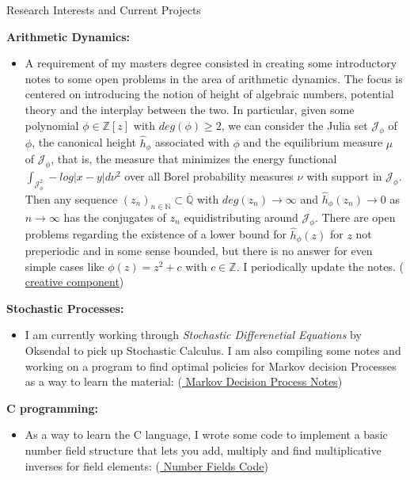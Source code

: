 \documentclass{resume} %
\newcommand{\N}{\mathbb{N}}
\newcommand{\Z}{\mathbb{Z}}
\newcommand{\Q}{\mathbb{Q}}
\newcommand{\MJ}{\mathcal{J}}
\begin{document}
\begin{rSection}{Research Interests and Current Projects}

{\bf Arithmetic Dynamics:}  
\begin{itemize}
\item A requirement of my masters degree consisted in creating some introductory notes to some open problems in the area of arithmetic dynamics. The focus is centered on introducing the notion of height of algebraic numbers,  potential theory and the interplay between the two. In particular, given some polynomial $\phi \in \Z[z]$ with $deg(\phi) \geq 2$, we can consider the Julia set $\MJ_{\phi}$ of $\phi$, the canonical height $\hat{h}_\phi$ associated with $\phi$ and the equilibrium measure $\mu$ of $\MJ_{\phi}$, that is, the measure that minimizes the energy functional $\int_{\MJ_{\phi}^2}-log|x-y|d\nu^2$ over all Borel probability measures $\nu$ with support in $\MJ_{\phi}$. Then any sequence $(z_n)_{n \in \N} \subset \overline{\Q}$ with $deg(z_n) \rightarrow \infty$ and $\hat{h}_{\phi}(z_n) \rightarrow 0$ as $n \rightarrow \infty$ has the conjugates of $z_n$ equidistributing around $\MJ_\phi$. There are open problems regarding the existence of a lower bound for $\hat{h}_{\phi}(z)$ for $z$ not preperiodic and in some sense bounded, but there is no answer for even simple cases like $\phi(z) = z^2+c$ with $c \in \Z$. I periodically update the notes. (\href{https://github.com/carsonaj/Math/blob/master/Arithmetic%20Dynamics/Arithmetic%20Dynamics%20Notes.pdf}{{\color{blue} creative component}})
\end{itemize}

{\bf Stochastic Processes:}
\begin{itemize}
\item I am currently working through \textit{Stochastic Differenetial Equations} by Oksendal to pick up Stochastic Calculus. I am also compiling some notes and working on a program to find optimal policies for Markov decision Processes as a way to learn the material: (\href{https://github.com/carsonaj/Math/blob/master/Optimization/Markov%20Decision%20Processes.pdf}{{\color{blue} Markov Decision Process Notes}})
\end{itemize}

{\bf C programming:}
\begin{itemize}
\item As a way to learn the C language, I wrote some code to implement a basic number field structure that lets you add, multiply and find multiplicative inverses for field elements: (\href{https://github.com/carsonaj/number-fields}{{\color{blue} Number Fields Code}})
\end{itemize}



\end{rSection}
\end{document}
